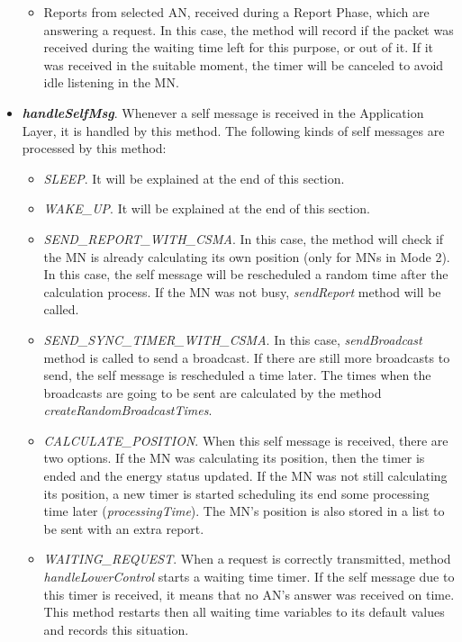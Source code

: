 \begin{itemize}
\begin{itemize}
    \item Reports from selected \ac{AN}, received during a Report Phase, which are answering a request. In this case, the method will record if the packet was
    received during the waiting time left for this purpose, or out of it. If it was received in the suitable moment, the timer will be canceled to
    avoid idle listening in the \ac{MN}.
  \end{itemize}

  \item \textbf{\textit{handleSelfMsg}}. Whenever a self message is received in the Application Layer, it is handled by this method. The following 
  kinds of self messages are processed by this method:
  \begin{itemize}
    \item \textit{SLEEP}. It will be explained at the end of this section.

    \item \textit{WAKE\_UP}. It will be explained at the end of this section.

    \item \textit{SEND\_REPORT\_WITH\_CSMA}. In this case, the method will check if the \ac{MN} is already calculating its own position (only for 
    \acp{MN} in Mode 2). In this case, the self message will be rescheduled a random time after the calculation process. If the \ac{MN} 
    was not busy, \textit{sendReport} method will be called.

    \item \textit{SEND\_SYNC\_TIMER\_WITH\_CSMA}. In this case, \textit{sendBroadcast} method is called to send a broadcast. If there are still 
    more broadcasts to send, the self message is rescheduled a time later. The times when the broadcasts are going to be sent are calculated 
    by the method \textit{createRandomBroadcastTimes}.

    \item \textit{CALCULATE\_POSITION}. When this self message is received, there are two options. If the \ac{MN} was calculating its position, then
    the timer is ended and the energy status updated. If the \ac{MN} was not still calculating its position, a new timer is started scheduling its end
    some processing time later (\textit{processingTime}). The \ac{MN}'s position is also stored in a list to be sent with an extra report.

    \item \textit{WAITING\_REQUEST}. When a request is correctly transmitted, method \textit{handleLowerControl} starts a waiting time timer. If the
    self message due to this timer is received, it means that no \ac{AN}'s answer was received on time. This method restarts then all waiting time 
    variables to its default values and records this situation.


\end{itemize}
\end{itemize}
